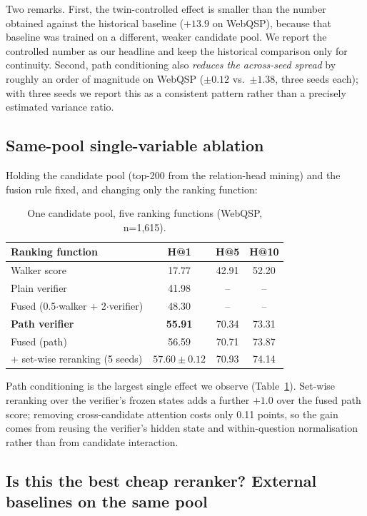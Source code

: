 \documentclass[sigconf,review,anonymous]{acmart}
\begin{document}
Two remarks. First, the twin-controlled effect is smaller than the number obtained against the historical baseline ($+13.9$ on WebQSP), because that baseline was trained on a different, weaker candidate pool. We report the controlled number as our headline and keep the historical comparison only for continuity. Second, path conditioning also \emph{reduces the across-seed spread} by roughly an order of magnitude on WebQSP ($\pm0.12$ vs.\ $\pm1.38$, three seeds each); with three seeds we report this as a consistent pattern rather than a precisely estimated variance ratio.

\subsection{Same-pool single-variable ablation}
\label{sec:samepool}

Holding the candidate pool (top-200 from the relation-head mining) and the fusion rule fixed, and changing only the ranking function:

\begin{table}[t]
\centering\small
\caption{One candidate pool, five ranking functions (WebQSP, n=1,615).}
\label{tab:samepool}
\begin{tabular}{lccc}
\toprule
Ranking function & H@1 & H@5 & H@10 \\
\midrule
Walker score & 17.77 & 42.91 & 52.20 \\
Plain verifier & 41.98 & -- & -- \\
Fused (0.5$\cdot$walker + 2$\cdot$verifier) & 48.30 & -- & -- \\
\textbf{Path verifier} & \textbf{55.91} & 70.34 & 73.31 \\
Fused (path) & 56.59 & 70.71 & 73.87 \\
+ set-wise reranking (5 seeds) & $57.60\pm0.12$ & 70.93 & 74.14 \\
\bottomrule
\end{tabular}
\end{table}

Path conditioning is the largest single effect we observe (Table~\ref{tab:samepool}). Set-wise reranking over the verifier's frozen states adds a further $+1.0$ over the fused path score; removing cross-candidate attention costs only 0.11 points, so the gain comes from reusing the verifier's hidden state and within-question normalisation rather than from candidate interaction.

\subsection{Is this the best cheap reranker? External baselines on the same pool}
\label{sec:external}
\end{document}
